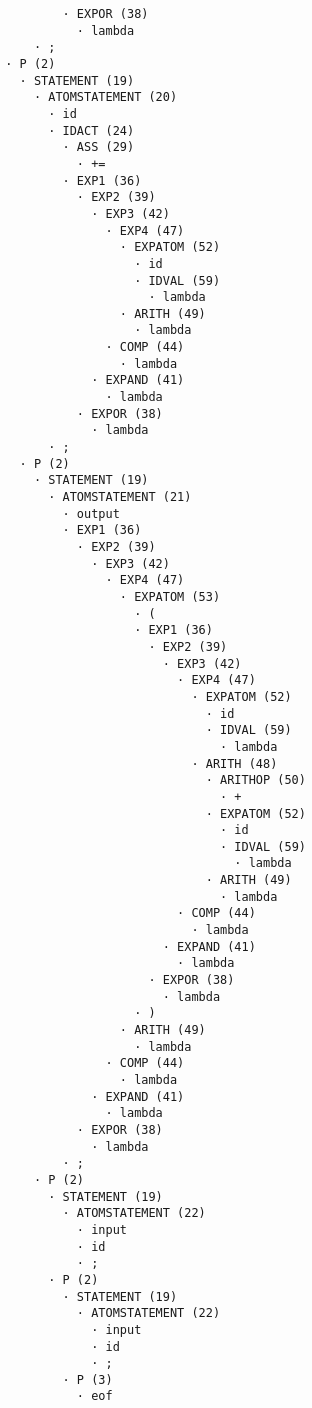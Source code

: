 \begin{enumerate}
\begin{tcolorbox}[title={Árbol sintáctico}, colback=white, breakable]
\begin{lstlisting}
                · EXPOR (38)
                  · lambda
            · ;
        · P (2)
          · STATEMENT (19)
            · ATOMSTATEMENT (20)
              · id
              · IDACT (24)
                · ASS (29)
                  · +=
                · EXP1 (36)
                  · EXP2 (39)
                    · EXP3 (42)
                      · EXP4 (47)
                        · EXPATOM (52)
                          · id
                          · IDVAL (59)
                            · lambda
                        · ARITH (49)
                          · lambda
                      · COMP (44)
                        · lambda
                    · EXPAND (41)
                      · lambda
                  · EXPOR (38)
                    · lambda
              · ;
          · P (2)
            · STATEMENT (19)
              · ATOMSTATEMENT (21)
                · output
                · EXP1 (36)
                  · EXP2 (39)
                    · EXP3 (42)
                      · EXP4 (47)
                        · EXPATOM (53)
                          · (
                          · EXP1 (36)
                            · EXP2 (39)
                              · EXP3 (42)
                                · EXP4 (47)
                                  · EXPATOM (52)
                                    · id
                                    · IDVAL (59)
                                      · lambda
                                  · ARITH (48)
                                    · ARITHOP (50)
                                      · +
                                    · EXPATOM (52)
                                      · id
                                      · IDVAL (59)
                                        · lambda
                                    · ARITH (49)
                                      · lambda
                                · COMP (44)
                                  · lambda
                              · EXPAND (41)
                                · lambda
                            · EXPOR (38)
                              · lambda
                          · )
                        · ARITH (49)
                          · lambda
                      · COMP (44)
                        · lambda
                    · EXPAND (41)
                      · lambda
                  · EXPOR (38)
                    · lambda
                · ;
            · P (2)
              · STATEMENT (19)
                · ATOMSTATEMENT (22)
                  · input
                  · id
                  · ;
              · P (2)
                · STATEMENT (19)
                  · ATOMSTATEMENT (22)
                    · input
                    · id
                    · ;
                · P (3)
                  · eof
        \end{lstlisting}
    \end{tcolorbox}



\end{enumerate}


